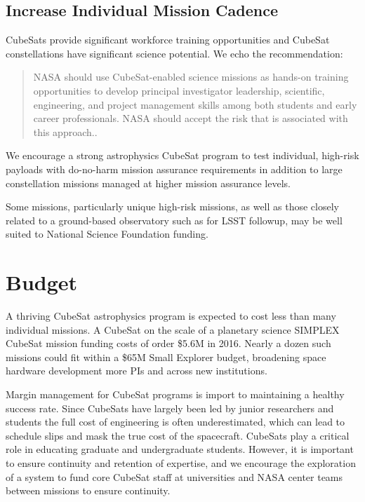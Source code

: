 \documentclass[12pt]{article}
\begin{document}
\subsection{Increase Individual Mission Cadence}
CubeSats provide significant workforce training opportunities and CubeSat constellations have significant science potential.
We echo the \cite{national_academies_of_sciences_achieving_2016} recommendation:
\begin{quote}
    NASA should use CubeSat-enabled science missions as hands-on training opportunities to develop principal investigator leadership, scientific, engineering, and project management skills among both students and early career professionals. NASA should accept the risk that is associated with this approach..
\end{quote}
We encourage a strong astrophysics CubeSat program to test individual, high-risk payloads with do-no-harm mission assurance requirements in addition to large constellation missions managed at higher mission assurance levels. 

Some missions, particularly unique high-risk missions, as well as those closely related to a ground-based observatory such as for LSST followup, may be well suited to National Science Foundation funding. 

\section{Budget}
A thriving CubeSat astrophysics program is expected to cost less than many individual missions.
A CubeSat on the scale of a planetary science SIMPLEX CubeSat mission funding\cite{spann_nasa_2016}  costs of order \$5.6M in 2016.
Nearly a dozen such missions could fit within a \$65M Small Explorer budget, broadening space hardware development more PIs and across new institutions.

Margin management for CubeSat programs is import to maintaining a healthy success rate. Since CubeSats have largely been led by junior researchers and students the full cost of engineering is often underestimated, which can lead to schedule slips and mask the true cost of the spacecraft. 
CubeSats play a critical role in educating graduate and undergraduate students.
However, it is important to ensure continuity and retention of expertise, and we encourage the exploration of a system to fund core CubeSat staff at universities and NASA center teams between missions to ensure continuity. 
\end{document}

